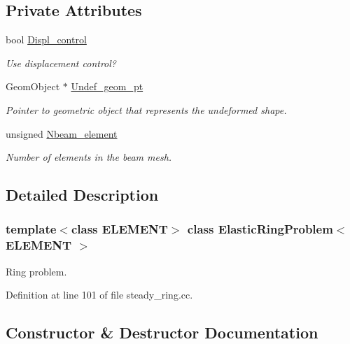\subsection*{Private Attributes}
\begin{DoxyCompactItemize}
\item 
bool \hyperlink{classElasticRingProblem_a919d11c9d2167d909c4d4563e9ca83b6}{Displ\+\_\+control}
\begin{DoxyCompactList}\small\item\em Use displacement control? \end{DoxyCompactList}\item 
Geom\+Object $\ast$ \hyperlink{classElasticRingProblem_a08e4afcece28aee2d1ee2e6c54394be8}{Undef\+\_\+geom\+\_\+pt}
\begin{DoxyCompactList}\small\item\em Pointer to geometric object that represents the undeformed shape. \end{DoxyCompactList}\item 
unsigned \hyperlink{classElasticRingProblem_aa57e3dd4e9a5187ef7394b019e68b1ca}{Nbeam\+\_\+element}
\begin{DoxyCompactList}\small\item\em Number of elements in the beam mesh. \end{DoxyCompactList}\end{DoxyCompactItemize}


\subsection{Detailed Description}
\subsubsection*{template$<$class E\+L\+E\+M\+E\+NT$>$\newline
class Elastic\+Ring\+Problem$<$ E\+L\+E\+M\+E\+N\+T $>$}

Ring problem. 

Definition at line 101 of file steady\+\_\+ring.\+cc.



\subsection{Constructor \& Destructor Documentation}
\mbox{\label{classElasticRingProblem_a46779ff320754561750e22216f7605e3}} 

